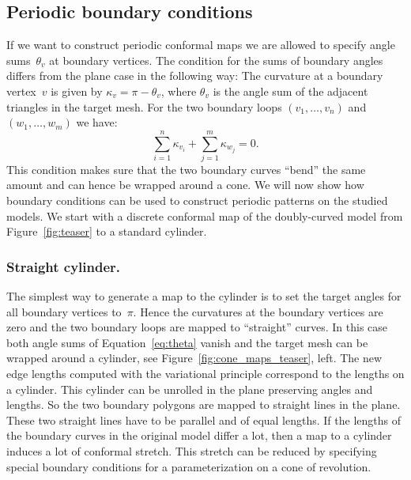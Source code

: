 \documentclass[article.tex]{subfiles}
\begin{document}
\subsection{Periodic boundary conditions}
\label{sec:boundary}

If we want to construct periodic conformal maps we are allowed
to specify angle sums~$\theta_v$ at boundary vertices. The condition
for the sums of boundary angles differs from the plane case in the
following way: The curvature at a boundary vertex~$v$ is given by
$\kappa_v = \pi -\theta_v$, where $\theta_v$ is the angle sum of the
adjacent triangles in the target mesh. For the two boundary loops
$(v_1, \ldots, v_n)$ and $(w_1, \ldots, w_m)$ we have:
\begin{equation}
\sum_{i=1}^n \kappa_{v_i} + \sum_{j=1}^m \kappa_{w_j} = 0. \label{eq:theta}
\end{equation}
This condition makes sure that the two boundary curves ``bend'' the
same amount and can hence be wrapped around a cone. 
We will now show how boundary conditions can be
used to construct periodic patterns on the studied models. We start
with a discrete conformal map of the doubly-curved model from Figure~\ref{fig:teaser} 
to a standard cylinder. 

\subsubsection{Straight cylinder.}
The simplest way to generate a map to the cylinder is to set the
target angles for all boundary vertices to~$\pi$. Hence the curvatures
at the boundary vertices are zero and the two boundary loops are
mapped to ``straight'' curves. 
In this case both angle sums of Equation~\ref{eq:theta}
vanish and the target mesh can be wrapped around a cylinder, see 
Figure~\ref{fig:cone_maps_teaser}, left. The new edge lengths
computed with the variational principle correspond to the lengths on a
cylinder. This cylinder can be unrolled in the plane preserving angles
and lengths. So the two boundary polygons are mapped to straight lines
in the plane. These two straight lines have to be parallel and of
equal lengths.
%
%
If the lengths of the boundary curves in the original model differ a
lot, then a map to a cylinder induces a lot of conformal stretch. This stretch
can be reduced by specifying special boundary conditions for a
parameterization on a cone of revolution.
\end{document}
